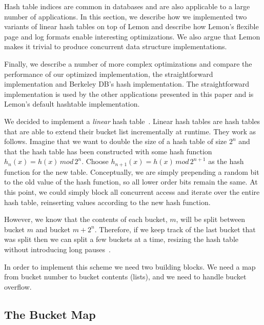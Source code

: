 \documentclass[10pt,letterpaper,twocolumn,english]{article}
\newcommand{\yad}{Lemon\xspace}
\begin{document}
Hash table indices are common in databases and are also applicable to
a large number of applications.  In this section, we describe how we
implemented two variants of linear hash tables on top of \yad and
describe how \yad's flexible page and log formats enable interesting
optimizations.  We also argue that \yad makes it trivial to produce
concurrent data structure implementations.

Finally, we describe a number of more complex optimizations and
compare the performance of our optimized implementation, the
straightforward implementation and Berkeley DB's hash implementation.
The straightforward implementation is used by the other applications
presented in this paper and is \yad's default hashtable
implementation. 

We decided to implement a {\em linear} hash table~\cite{lht}.  Linear
hash tables are hash tables that are able to extend their bucket list
incrementally at runtime. They work as follows. Imagine that we want
to double the size of a hash table of size $2^{n}$ and that the hash
table has been constructed with some hash function $h_{n}(x)=h(x)\,
mod\,2^{n}$.  Choose $h_{n+1}(x)=h(x)\, mod\,2^{n+1}$ as the hash
function for the new table. Conceptually, we are simply prepending a
random bit to the old value of the hash function, so all lower order
bits remain the same. At this point, we could simply block all
concurrent access and iterate over the entire hash table, reinserting
values according to the new hash function.

However, 
we know that the contents of each bucket, $m$, will be split between
bucket $m$ and bucket $m+2^{n}$. Therefore, if we keep track of the
last bucket that was split then we can split a few buckets at a time,
resizing the hash table without introducing long pauses~\cite{lht}.

In order to implement this scheme we need two building blocks.  We
need a map from bucket number to bucket contents (lists), and we need to handle bucket overflow.


\subsection{The Bucket Map}
\end{document}
